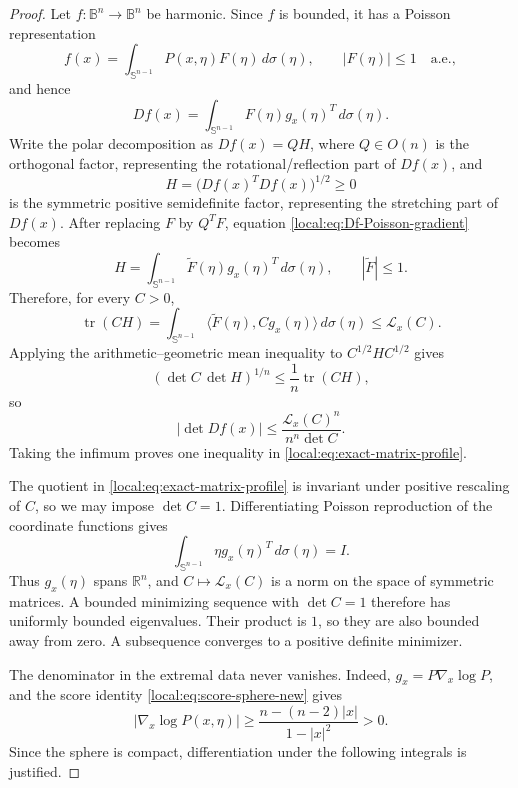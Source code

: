 \documentclass[11pt,reqno]{amsart}
\theoremstyle{remark}
\newcommand{\R}{\mathbb R}
\newcommand{\B}{\mathbb B}
\newcommand{\Sph}{\mathbb S}
\newcommand{\tr}{\operatorname{tr}}
\begin{document}
\begin{proof}
Let $f:\B^n\to\B^n$ be harmonic.  Since $f$ is bounded, it has a Poisson
representation
\[
 f(x)
 =
 \int_{\Sph^{n-1}}P(x,\eta)F(\eta)\,d\sigma(\eta),
 \qquad |F(\eta)|\le1\quad\text{a.e.},
\]
and hence
\begin{equation}\label{local:eq:Df-Poisson-gradient}
 Df(x)
 =
 \int_{\Sph^{n-1}}F(\eta)g_x(\eta)^T\,d\sigma(\eta).
\end{equation}
Write the polar decomposition as \(Df(x)=QH\), where \(Q\in O(n)\) is the orthogonal factor, representing the rotational/reflection part of \(Df(x)\), and
\[
H=\bigl(Df(x)^T Df(x)\bigr)^{1/2}\ge 0
\]
is the symmetric positive semidefinite factor, representing the stretching part of \(Df(x)\).
After replacing $F$ by $Q^TF$, equation \eqref{local:eq:Df-Poisson-gradient}
becomes
\[
 H
 =
 \int_{\Sph^{n-1}}\widetilde F(\eta)g_x(\eta)^T\,d\sigma(\eta),
 \qquad |\widetilde F|\le1.
\]
Therefore, for every $C>0$,
\[
 \tr(CH)
 =
 \int_{\Sph^{n-1}}
 \langle \widetilde F(\eta),Cg_x(\eta)\rangle\,d\sigma(\eta)
 \le
 \mathcal L_x(C).
\]
Applying the arithmetic--geometric mean inequality to
$C^{1/2}HC^{1/2}$ gives
\[
 (\det C\,\det H)^{1/n}
 \le
 \frac1n\tr(CH),
\]
so
\begin{equation}\label{local:eq:matrix-upper-bound}
 |\det Df(x)|
 \le
 \frac{\mathcal L_x(C)^n}{n^n\det C}.
\end{equation}
Taking the infimum proves one inequality in \eqref{local:eq:exact-matrix-profile}.

The quotient in \eqref{local:eq:exact-matrix-profile} is invariant under positive
rescaling of $C$, so we may impose $\det C=1$.  Differentiating Poisson reproduction of the coordinate functions gives
\[
 \int_{\Sph^{n-1}}\eta g_x(\eta)^T\,d\sigma(\eta)=I.
\]
Thus $g_x(\eta)$ spans $\R^n$, and $C\mapsto\mathcal L_x(C)$ is a
norm on the space of symmetric matrices.  A bounded minimizing sequence
with $\det C=1$ therefore has uniformly bounded eigenvalues.  Their
product is $1$, so they are also bounded away from zero.  A subsequence
converges to a positive definite minimizer.

The denominator in the extremal data never vanishes.  Indeed,
$g_x=P\nabla_x\log P$, and the score identity
\eqref{local:eq:score-sphere-new} gives
\[
 |\nabla_x\log P(x,\eta)|
 \ge\frac{n-(n-2)|x|}{1-|x|^2}>0.
\]
Since the sphere is compact, differentiation under the following
integrals is justified.


\end{proof}
\end{document}
